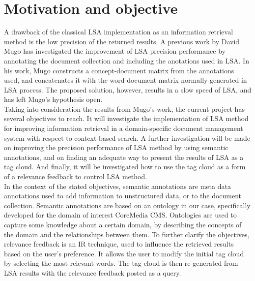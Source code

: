 \section{Motivation and objective}
\label{sec:introduction:motandobj}  
A drawback of the classical LSA implementation as an information retrieval method is the low precision of the returned results. A previous work by David Mugo \cite{mugo10} has investigated the improvement of LSA precision performance by annotating the document collection and including the anotations used in LSA. In his work, Mugo constructs a concept-document matrix from the annotations used, and concatenates it with the word-document matrix normally generated in LSA process. The proposed solution, however, results in a slow speed of LSA, and has left Mugo's hypothesis open. \\

Taking into consideration the results from Mugo's work, the current project has several objectives to reach. It will investigate the implementation of LSA method for improving information retrieval in a domain-specific document management system with respect to context-based search. A further investigation will be made on improving the precision performance of LSA method by using semantic annotations, and on finding an adequate way to present the results of LSA as a tag cloud. And finally, it will be investigated how to use the tag cloud as a form of a relevance feedback to control LSA method. \\

In the context of the stated objectives, semantic annotations are meta data annotations used to add information to unstructured data, or to the document collection. Semantic annotations are based on an ontology in our case, specifically developed for the domain of interest CoreMedia CMS. Ontologies are used to capture some knowledge about a certain domain, by describing the concepts of the domain and the relationships between them. To further clarify the objectives, relevance feedback is an IR technique, used to influence the retrieved results based on the user's preference. It allows the user to modify the initial tag cloud by selecting the most relevant words. The tag cloud is then re-generated from LSA results with the relevance feedback posted as a query. \\

